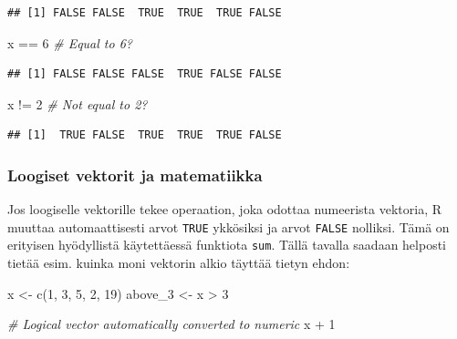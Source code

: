 \documentclass[
]{book}
\newenvironment{Shaded}{\begin{snugshade}}{\end{snugshade}}
\newcommand{\CommentTok}[1]{\textcolor[rgb]{0.56,0.35,0.01}{\textit{#1}}}
\newcommand{\DecValTok}[1]{\textcolor[rgb]{0.00,0.00,0.81}{#1}}
\newcommand{\FunctionTok}[1]{\textcolor[rgb]{0.00,0.00,0.00}{#1}}
\newcommand{\NormalTok}[1]{#1}
\newcommand{\OtherTok}[1]{\textcolor[rgb]{0.56,0.35,0.01}{#1}}
\newcommand{\SpecialCharTok}[1]{\textcolor[rgb]{0.00,0.00,0.00}{#1}}
\begin{document}
\begin{verbatim}
## [1] FALSE FALSE  TRUE  TRUE  TRUE FALSE
\end{verbatim}

\begin{Shaded}
\begin{Highlighting}[]
\NormalTok{x }\SpecialCharTok{==} \DecValTok{6} \CommentTok{\# Equal to 6?}
\end{Highlighting}
\end{Shaded}

\begin{verbatim}
## [1] FALSE FALSE FALSE  TRUE FALSE FALSE
\end{verbatim}

\begin{Shaded}
\begin{Highlighting}[]
\NormalTok{x }\SpecialCharTok{!=} \DecValTok{2} \CommentTok{\# Not equal to 2?}
\end{Highlighting}
\end{Shaded}

\begin{verbatim}
## [1]  TRUE FALSE  TRUE  TRUE  TRUE FALSE
\end{verbatim}

\hypertarget{loogiset-vektorit-ja-matematiikka}{%
\subsubsection{Loogiset vektorit ja matematiikka}\label{loogiset-vektorit-ja-matematiikka}}

Jos loogiselle vektorille tekee operaation, joka odottaa numeerista vektoria, R muuttaa automaattisesti arvot \texttt{TRUE} ykkösiksi ja arvot \texttt{FALSE} nolliksi. Tämä on erityisen hyödyllistä käytettäessä funktiota \texttt{sum}. Tällä tavalla saadaan helposti tietää esim. kuinka moni vektorin alkio täyttää tietyn ehdon:

\begin{Shaded}
\begin{Highlighting}[]
\NormalTok{x }\OtherTok{\textless{}{-}} \FunctionTok{c}\NormalTok{(}\DecValTok{1}\NormalTok{, }\DecValTok{3}\NormalTok{, }\DecValTok{5}\NormalTok{, }\DecValTok{2}\NormalTok{, }\DecValTok{19}\NormalTok{)}
\NormalTok{above\_3 }\OtherTok{\textless{}{-}}\NormalTok{ x }\SpecialCharTok{\textgreater{}} \DecValTok{3}

\CommentTok{\# Logical vector automatically converted to numeric}
\NormalTok{x }\SpecialCharTok{+} \DecValTok{1}
\end{Highlighting}
\end{Shaded}
\end{document}
